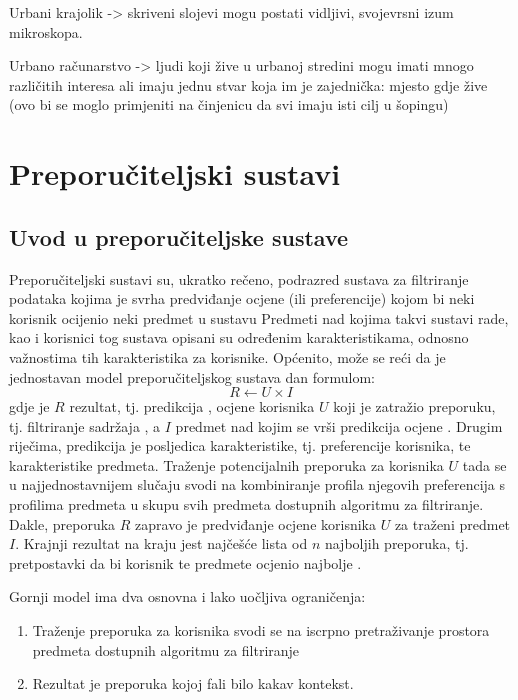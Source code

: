 \documentclass[times, utf8, diplomski, numeric]{fer}
\begin{document}
Urbani krajolik -> skriveni slojevi mogu postati vidljivi, svojevrsni izum
mikroskopa.

Urbano računarstvo -> ljudi koji žive u urbanoj stredini mogu imati mnogo
različitih interesa ali imaju jednu stvar koja im je zajednička: mjesto gdje
žive (ovo bi se moglo primjeniti na činjenicu da svi imaju isti cilj u šopingu)

\chapter{Preporučiteljski sustavi}
\section{Uvod u preporučiteljske sustave}
Preporučiteljski sustavi su, ukratko rečeno, podrazred sustava za filtriranje
podataka kojima je svrha predviđanje ocjene (ili preferencije) kojom bi neki
korisnik ocijenio neki predmet u sustavu \cite{RSHandbook} Predmeti nad kojima
takvi sustavi rade, kao i korisnici tog sustava opisani su određenim
karakteristikama, odnosno važnostima tih karakteristika za korisnike. Općenito,
može se reći da je jednostavan model preporučiteljskog sustava dan formulom:
\begin{equation}
\label{eq:elementarniModel}
	R \leftarrow U \times I
\end{equation}
gdje je $R$ rezultat, tj. predikcija ,
ocjene korisnika $U$  koji je zatražio preporuku, tj. filtriranje
sadržaja , a $I$ predmet nad kojim se vrši predikcija ocjene .
Drugim riječima, predikcija je posljedica karakteristike, tj. preferencije
korisnika, te karakteristike predmeta. Traženje potencijalnih preporuka za
korisnika $U$ tada se u najjednostavnijem slučaju svodi na kombiniranje profila
njegovih preferencija s profilima predmeta u skupu svih predmeta dostupnih
algoritmu za filtriranje.
Dakle, preporuka $R$ zapravo je predviđanje ocjene korisnika $U$ za
traženi predmet $I$. Krajnji rezultat na kraju jest najčešće lista od $n$
najboljih preporuka, tj. pretpostavki da bi korisnik te predmete ocjenio
najbolje . 

Gornji model ima dva osnovna i lako uočljiva ograničenja:
\begin{enumerate}
  \item Traženje preporuka za korisnika svodi se na iscrpno pretraživanje
  prostora predmeta dostupnih algoritmu za filtriranje
  \item Rezultat je preporuka kojoj fali bilo kakav kontekst.
\end{enumerate}
\end{document}
